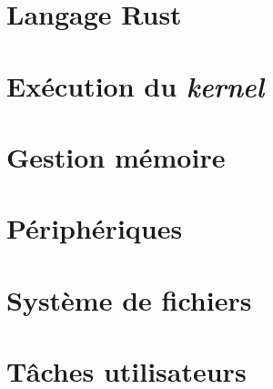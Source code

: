 \documentclass[a4paper, 12pt]{article}
\begin{document}
\newpage
\section{Langage Rust}



\newpage
\section{Exécution du \textit{kernel}}



\newpage
\section{Gestion mémoire}



\newpage
\section{Périphériques}



\newpage
\section{Système de fichiers}



\newpage
\section{Tâches utilisateurs}



\newpage
\end{document}
